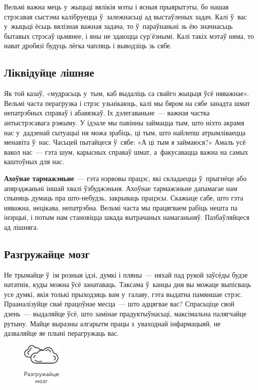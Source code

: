 Вельмі важна мець у~жыцьці вялікія мэты і ясныя прыярытэты, бо нашая стрэсавая сыстэма калібруецца ў~залежнасьці ад выстаўленых задач. Калі ў~вас у~жыцьці ёсьць вялізная важная задача, то ў~параўнаньні зь ёю значнасьць бытавых стрэсаў цьмянее, і яны не здаюцца сур'ёзнымі. Калі такіх мэтаў няма, то нават дробязі будуць лёгка чапляць і выводзіць зь сябе.

\subsection*{Ліквідуйце лішняе}

Як той казаў, «мудрасьць у~тым, каб выдаліць са свайго жыцьця ўсё няважнае». Вельмі часта перагрузка і стрэс узьнікаюць, калі мы бяром на сябе занадта шмат непатрэбных справаў і абавязкаў. Іх дэлегаваньне~--- важная частка антыстрэсавага рэжыму. У ідэале мы павінны займацца тым, што ніхто акрамя нас у~дадзенай сытуацыі ня можа зрабіць, ці тым, што найлепш атрымліваецца менавіта ў~нас. Часьцей пытайцеся ў~сябе: «А ці тым я займаюся?» Амаль усё вакол нас~--- гэта шум, карысных справаў шмат, а~факусавацца важна на самых каштоўных для нас.

\textbf{Ахоўнае тармажэньне}~--- гэта нэрвовы працэс, які складаецца ў~прыгнёце або апярэджаньні іншай хвалі ўзбуджэньня. Ахоўнае тармажэньне дапамагае нам спыняць думаць пра што-небудзь, закрываць працэсы. Скажыце сабе, што гэта няважна, нецікава, непатрэбна. Вельмі часта мы працягваем рабіць нешта па інэрцыі, і потым нам становіцца шкада вытрачаных намаганьняў. Пазбаўляйцеся ад лішняга.

\subsection*{Разгружайце мозг}

Не трымайце ў~ім розныя ідэі, думкі і пляны~--- няхай пад рукой заўсёды будзе нататнік, куды можна ўсё занатаваць. Таксама ў~канцы дня вы можаце выпісваць усе думкі, якія толькі прыходзяць вам у~галаву, гэта выдатна памяншае стрэс. Прааналізуйце сваё працоўнае месца~--- што адцягвае вас? Спрасьціце свой дзень~--- выдаляйце ўсё, што замінае прадуктыўнасьці, максімальна палягчайце рутыну. Майце выразны алгарытм працы з~уваходнай інфармацыяй, не дазваляйце яе плыні перагружаць вас. 

\begin{figure}[htb!]
  \centering
  \includegraphics[scale=1.5]{willpower/ch7/7.pdf}
\end{figure}

